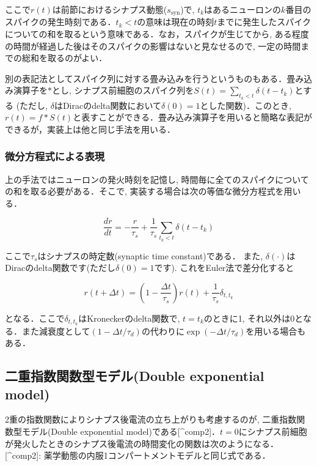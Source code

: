 ここで${r(t)}$は前節におけるシナプス動態($s_{\text{syn}}$)で, $t_{k}$はあるニューロンの$k$番目のスパイクの発生時刻である．${t_{k}<t}$の意味は現在の時刻$t$までに発生したスパイクについての和を取るという意味である．なお，スパイクが生じてから, ある程度の時間が経過した後はそのスパイクの影響はないと見なせるので, 一定の時間までの総和を取るのがよい．

別の表記法としてスパイク列に対する畳み込みを行うというものもある．畳み込み演算子を$*$とし, シナプス前細胞のスパイク列を$S(t)=\sum_{t_{k}< t} \delta\left(t-t_{k}\right)$とする (ただし, $\delta$はDiracのdelta関数において$\delta(0)=1$とした関数)．このとき, $r(t)=f*S(t)$と表すことができる．畳み込み演算子を用いると簡略な表記ができるが，実装上は他と同じ手法を用いる．

\subsubsection{微分方程式による表現}
上の手法ではニューロンの発火時刻を記憶し, 時間毎に全てのスパイクについての和を取る必要がある．そこで, 実装する場合は次の等価な微分方程式を用いる．


\begin{equation}
\frac{dr}{dt}=-\frac{r}{\tau_{s}}+\frac{1}{\tau_{s}} \sum_{t_{k}< t} \delta\left(t-t_{k}\right)   
\end{equation}


ここで$\tau_s$はシナプスの時定数(synaptic time constant)である． また, $\delta(\cdot)$はDiracのdelta関数です(ただし$\delta(0)=1$です). これをEuler法で差分化すると 


\begin{equation}
r(t+\Delta t)=\left(1-\frac{\Delta t}{\tau_{s}}\right)r(t)+\frac{1}{\tau_{s}}\delta_{t,t_{k}} 
\end{equation}


となる．ここで$\delta_{t,t_{k}}$はKroneckerのdelta関数で, $t=t_{k}$のときに1, それ以外は0となる．また減衰度として$\left(1-\Delta  t/\tau_{d}\right)$の代わりに$\exp\left(-\Delta t/\tau_{d}\right)$を用いる場合もある．
\subsection{二重指数関数型モデル(Double exponential model)}
2重の指数関数によりシナプス後電流の立ち上がりも考慮するのが, 二重指数関数型モデル(Double exponential model)である[^comp2]．$t=0$にシナプス前細胞が発火したときのシナプス後電流の時間変化の関数は次のようになる．
[^comp2]: 薬学動態の内服1コンパートメントモデルと同じ式である．


